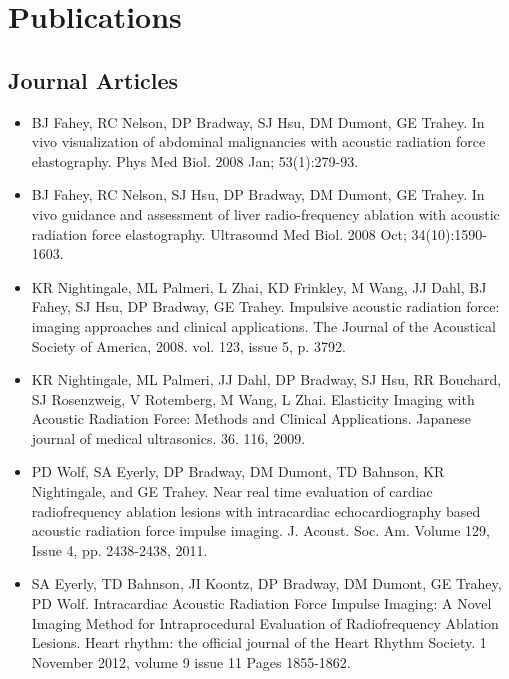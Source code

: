 \documentclass[letterpaper,10pt,english]{sphinxmanual}
\begin{document}
\section{Publications}
\label{resume:publications}

\subsection{Journal Articles}
\label{resume:journal-articles}\begin{itemize}
\item {} 
BJ Fahey, RC Nelson, DP Bradway, SJ Hsu, DM Dumont, GE Trahey. In
vivo visualization of abdominal malignancies with acoustic radiation
force elastography. Phys Med Biol. 2008 Jan; 53(1):279-93.

\item {} 
BJ Fahey, RC Nelson, SJ Hsu, DP Bradway, DM Dumont, GE Trahey. In
vivo guidance and assessment of liver radio-frequency ablation with
acoustic radiation force elastography. Ultrasound Med Biol. 2008 Oct;
34(10):1590-1603.

\item {} 
KR Nightingale, ML Palmeri, L Zhai, KD Frinkley, M Wang, JJ Dahl, BJ
Fahey, SJ Hsu, DP Bradway, GE Trahey. Impulsive acoustic radiation
force: imaging approaches and clinical applications. The Journal of
the Acoustical Society of America, 2008. vol. 123, issue 5, p. 3792.

\item {} 
KR Nightingale, ML Palmeri, JJ Dahl, DP Bradway, SJ Hsu, RR Bouchard,
SJ Rosenzweig, V Rotemberg, M Wang, L Zhai. Elasticity Imaging with
Acoustic Radiation Force: Methods and Clinical Applications. Japanese
journal of medical ultrasonics. 36. 116, 2009.

\item {} 
PD Wolf, SA Eyerly, DP Bradway, DM Dumont, TD Bahnson, KR
Nightingale, and GE Trahey. Near real time evaluation of cardiac
radiofrequency ablation lesions with intracardiac echocardiography
based acoustic radiation force impulse imaging. J. Acoust. Soc. Am.
Volume 129, Issue 4, pp. 2438-2438, 2011.

\item {} 
SA Eyerly, TD Bahnson, JI Koontz, DP Bradway, DM Dumont, GE Trahey,
PD Wolf. Intracardiac Acoustic Radiation Force Impulse Imaging: A
Novel Imaging Method for Intraprocedural Evaluation of Radiofrequency
Ablation Lesions. Heart rhythm: the official journal of the Heart
Rhythm Society. 1 November 2012, volume 9 issue 11 Pages 1855-1862.


\end{itemize}
\end{document}
